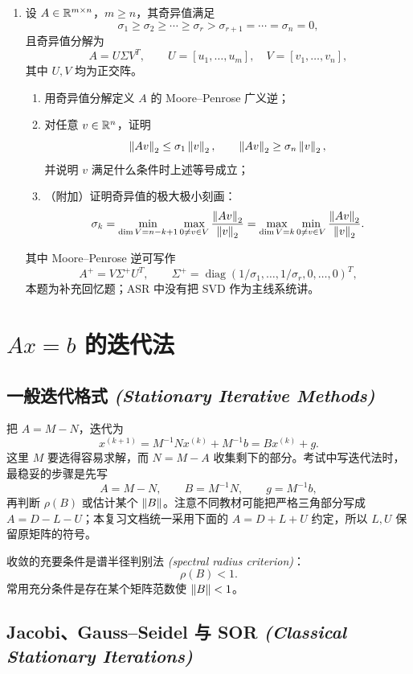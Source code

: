 \documentclass{article}
\newcommand{\diag}{\operatorname{diag}}
\newcommand{\eng}[1]{\texorpdfstring{{\normalfont\rmfamily\itshape\textcolor{blue!65!black}{(#1)}}}{(#1)}}
\begin{document}
\begin{enumerate}
  \item 设 $A\in\mathbb{R}^{m\times n}$，$m\ge n$，其奇异值满足
  \[
    \sigma_1\ge\sigma_2\ge\cdots\ge\sigma_r>
    \sigma_{r+1}=\cdots=\sigma_n=0,
  \]
  且奇异值分解为
  \[
    A=U\Sigma V^T,\qquad
    U=[u_1,\dots,u_m],\quad V=[v_1,\dots,v_n],
  \]
  其中 $U,V$ 均为正交阵。
  \begin{enumerate}[(1)]
    \item 用奇异值分解定义 $A$ 的 Moore--Penrose 广义逆；
    \item 对任意 $v\in\mathbb{R}^n$，证明
    \[
      \left\| Av \right\|_2\le\sigma_1\left\| v \right\|_2,\qquad
      \left\| Av \right\|_2\ge\sigma_n\left\| v \right\|_2,
    \]
    并说明 $v$ 满足什么条件时上述等号成立；
    \item （附加）证明奇异值的极大极小刻画：
    \[
      \sigma_k=\min_{\dim V=n-k+1}\max_{0\ne v\in V}\frac{\left\| Av \right\|_2}{\left\| v \right\|_2}
      =
      \max_{\dim V=k}\min_{0\ne v\in V}\frac{\left\| Av \right\|_2}{\left\| v \right\|_2}.
    \]
  \end{enumerate}
  其中 Moore--Penrose 逆可写作
  \[
    A^+=V\Sigma^+U^T,\qquad
    \Sigma^+=\diag(1/\sigma_1,\dots,1/\sigma_r,0,\dots,0)^T,
  \]
  本题为补充回忆题；ASR 中没有把 SVD 作为主线系统讲。
\end{enumerate}

\section{\texorpdfstring{$Ax=b$}{Ax=b} 的迭代法}

\subsection{一般迭代格式 \eng{Stationary Iterative Methods}}

把 $A=M-N$，迭代为
\[
  x^{(k+1)}=M^{-1}Nx^{(k)}+M^{-1}b = Bx^{(k)}+g.
\]
这里 $M$ 要选得容易求解，而 $N=M-A$ 收集剩下的部分。考试中写迭代法时，
最稳妥的步骤是先写
\[
  A=M-N,\qquad B=M^{-1}N,\qquad g=M^{-1}b,
\]
再判断 $\rho(B)$ 或估计某个 $\left\| B \right\|$。注意不同教材可能把严格三角部分写成
$A=D-L-U$；本复习文档统一采用下面的 $A=D+L+U$ 约定，所以 $L,U$ 保留原矩阵的符号。

收敛的充要条件是谱半径判别法 \eng{spectral radius criterion}：
\[
  \rho(B)<1.
\]
常用充分条件是存在某个矩阵范数使 $\left\| B \right\|<1$。

\subsection{Jacobi、Gauss--Seidel 与 SOR \eng{Classical Stationary Iterations}}
\end{document}
